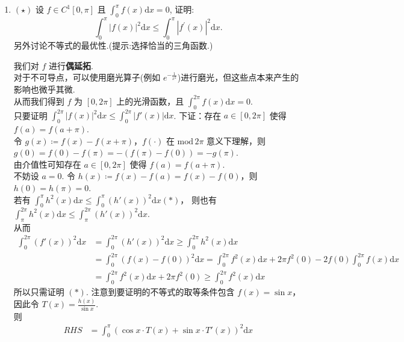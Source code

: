 \begin{enumerate}
    \item[5.]$(\star)$ 设 \(\displaystyle f\in C^{1}[0,\pi ]\) 且 \(\displaystyle \int_{0}^{\pi}f(x)\mathrm{d}x = 0\), 证明:
    \[\displaystyle \int_{0}^{\pi}|f(x)|^{2}\mathrm{d}x\leq \int_{0}^{\pi}|f^{\prime}(x)|^{2}\mathrm{d}x.\]
    另外讨论不等式的最优性.(提示:选择恰当的三角函数.)
    \begin{solution}
        我们对 $f$ 进行\textbf{偶延拓}. \\
        对于不可导点，可以使用磨光算子(例如 $\displaystyle e^{-\frac{1}{x^2}}$)进行磨光，但这些点本来产生的影响也微乎其微.\\
        从而我们得到 $f$ 为 $[0,2\pi]$ 上的光滑函数，且 $\displaystyle\int_0^{2\pi}f(x)\mathrm{d}x=0$.\\
        只要证明 $\displaystyle \int_0^{2\pi}\left| f(x) \right|^2\mathrm{d}x\leq\int_0^{2\pi}\left| f'(x) \right|\mathrm{d}x$. 下证：存在 $a\in[0,2\pi]$ 使得 $f(a)=f(a+\pi)$.\\
        令 $g(x)\coloneqq f(x)-f(x+\pi)$，$f(\cdot)$ 在 $\mathrm{mod}\, 2\pi$ 意义下理解，则 $g(0)=f(0)-f(\pi)=-(f(\pi)-f(0))=-g(\pi)$. \\
        由介值性可知存在 $a\in[0,2\pi]$ 使得 $f(a)=f(a+\pi)$.\\
        不妨设 $a=0$. 令 $h(x)\coloneqq f(x)-f(a)=f(x)-f(0)$，则 $h(0)=h(\pi)=0$.\\
        若有 $\displaystyle \int_0^\pi h^2(x)\mathrm{d}x\leq \int_0^\pi (h'(x))^2\mathrm{d}x (*)$，
        则也有 $\displaystyle \int_\pi^{2\pi} h^2(x)\mathrm{d}x\leq \int_\pi^{2\pi} (h'(x))^2\mathrm{d}x$.\\
        从而 
        \[
        \begin{aligned}
        \displaystyle
        \int_0^{2\pi}(f'(x))^2\mathrm{d}x&=\int_0^{2\pi}(h'(x))^2\mathrm{d}x \geq \int_0^{2\pi}h^2(x)\mathrm{d}x\\
        &=\int_0^{2\pi}(f(x)-f(0))^2\mathrm{d}x=\int_0^{2\pi}f^2(x)\mathrm{d}x+2\pi f^2(0)-2f(0)\int_0^{2\pi}f(x)\mathrm{d}x\\
        &=\int_0^{2\pi}f^2(x)\mathrm{d}x+2\pi f^2(0) \geq \int_0^{2\pi}f^2(x)\mathrm{d}x
        \end{aligned}
        \]
        所以只需证明 $(*)$. 注意到要证明的不等式的取等条件包含 $f(x)=\sin{x}$，因此令 $\displaystyle T(x)=\frac{h(x)}{\sin{x}}$.\\
        则 
        \[
        \begin{aligned}
            RHS&=\int_0^\pi (\cos{x}\cdot T(x)+\sin{x}\cdot T'(x))^2\mathrm{d}x\\

\end{aligned}\]
\end{solution}
\end{enumerate}
